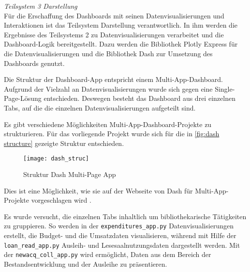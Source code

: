     \noindent
    \textit{Teilsystem 3 Darstellung}\\
    Für die Erschaffung des Dashboards mit seinen Datenvisualisierungen und Interaktionen ist das Teilsystem Darstellung verantwortlich.
    In ihm werden die Ergebnisse des Teilsystems 2 zu Datenvisualisierungen verarbeitet und die Dashboard-Logik bereitgestellt.
    Dazu werden die Bibliothek Plotly Express für die Datenvisualisierungen und die Bibliothek Dash zur Umsetzung des Dashboards genutzt. 
    
    Die Struktur der Dashboard-App entspricht einem Multi-App-Dashboard.
    Aufgrund der Vielzahl an Datenvisualisierungen wurde sich gegen eine Single-Page-Lösung entschieden. Deswegen besteht das Dashboard
    aus drei einzelnen Tabs, auf die die einzelnen Datenvisualisierungen aufgeteilt sind.
    
    Es gibt verschiedene Möglichkeiten Multi-App-Dashboard-Projekte zu strukturieren. Für das vorliegende Projekt wurde sich für die in 
    \autoref{fig:dash structure} gezeigte Struktur entschieden.

    \begin{figure}[H]
        \centering
            \texttt{[image: dash\_struc]}
            \caption{Struktur Dash Multi-Page App}
            \label{fig:dash structure}
    \end{figure}
    
    Dies ist eine Möglichkeit, wie sie auf der Webseite von Dash für Multi-App-Projekte vorgeschlagen wird \cite[vgl.][]{plotly_url_2021}.
    
    Es wurde versucht, die einzelnen Tabs inhaltlich um bibliothekarische Tätigkeiten zu gruppieren. So werden in der \texttt{expenditures\_app.py}
    Datenvisualisierungen erstellt, die Budget- und die Umsatzdaten visualisieren, während mit Hilfe der \texttt{loan\_read\_app.py}
    Ausleih- und Lesesaalnutzungsdaten dargestellt werden. Mit der \texttt{newacq\_coll\_app.py} wird ermöglicht, Daten aus dem Bereich der Bestandsentwicklung und der 
    Ausleihe zu präsentieren.

